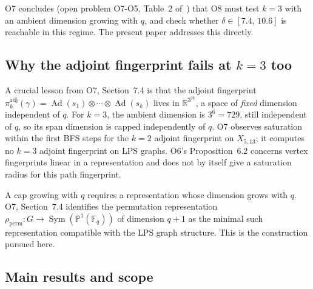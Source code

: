 \documentclass[11pt,a4paper]{article}
\theoremstyle{definition}
\theoremstyle{remark}
\DeclareMathOperator{\Ad}{Ad}
\DeclareMathOperator{\Sym}{Sym}
\newcommand{\R}{\mathbb{R}}
\newcommand{\F}{\mathbb{F}}
\newcommand{\Proj}{\mathbb{P}}
\newcommand{\perm}{\mathrm{perm}}
\begin{document}
    O7 concludes (open problem O7-O5, Table~2 of~\cite{Beau2026a11}) that O8 must test
    $k = 3$ with an ambient dimension growing with $q$, and check whether
    $\delta \in [7.4,\,10.6]$ is reachable in this regime.
    The present paper addresses this directly.

  \subsection{Why the adjoint fingerprint fails at $k = 3$ too}
    \label{sec:intro-adjoint-fail}

    A crucial lesson from O7, Section~7.4 is that the adjoint fingerprint
    $\pi_k^\mathrm{adj}(\gamma) = \Ad(s_1) \otimes \cdots \otimes \Ad(s_k)$ lives
    in $\R^{3^{2k}}$, a space of \emph{fixed} dimension independent of $q$.
    For $k = 3$, the ambient dimension is $3^6 = 729$, still independent of $q$, so its span
    dimension is capped independently of $q$.
    O7 observes saturation within the first BFS steps for the $k=2$ adjoint fingerprint on $X_{5,13}$;
    it computes no $k=3$ adjoint fingerprint on LPS graphs.
    O6's Proposition~6.2 concerns vertex fingerprints linear in a representation and does not by
    itself give a saturation radius for this path fingerprint.

    A cap growing with $q$ requires a representation whose dimension grows with $q$.
    O7, Section~7.4 identifies the permutation representation
    $\rho_\perm : G \to \Sym(\Proj^1(\F_q))$ of dimension $q+1$ as the minimal
    such representation compatible with the LPS graph structure.
    This is the construction pursued here.

  \subsection{Main results and scope}
    \label{sec:intro-main}
\end{document}
